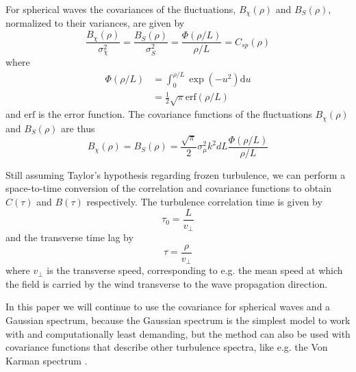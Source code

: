 For spherical waves the covariances of the fluctuations, $B_{\chi}(\rho)$ and
$B_{S}(\rho)$, normalized to their variances, are given by
\begin{equation}
 \frac{B_{\chi} (\rho)}{\sigma_{\chi}^2} = \frac{B_{S} (\rho)}{\sigma_{S}^2} = \frac{\Phi\left(\rho/L\right)}{\rho/L} = C_{sp}(\rho)
\end{equation}
where
\begin{align}\label{eq:gaussian_correlation}
 \Phi \left(\rho/L \right) &= \int_0^{\rho/L} \exp{\left(-u^2\right)} \mathrm{d} u  \\
 &= \frac{1}{2} \sqrt{\pi} \mathrm{erf}\left( \rho/L \right)
\end{align}
and $\mathrm{erf}$ is the error function.
The covariance functions of the fluctuations $B_{\chi}(\rho)$ and $B_{S}(\rho)$ are thus
\begin{equation}\label{eq:variances}
 B_{\chi} (\rho) = B_{S}(\rho) = \frac{\sqrt{\pi}}{2} \sigma_{\mu}^2 k^2 d L
\frac{\Phi(\rho/L) }{\rho / L}
\end{equation}

Still assuming Taylor's hypothesis regarding frozen turbulence, we can perform a
space-to-time conversion of the correlation and covariance functions to obtain
$C(\tau)$ and $B(\tau)$ respectively. The turbulence correlation time is given
by
\begin{equation}
 \tau_0 = \frac{L}{v_{\bot}}
\end{equation}
and the transverse time lag by
\begin{equation}
  \tau = \frac{\rho}{v_{\bot}}
\end{equation}
where $v_{\bot}$ is the transverse speed, corresponding to e.g. the mean speed
at which the field is carried by the wind transverse to the wave propagation
direction.

In this paper we will continue to use the covariance for spherical waves and a
Gaussian spectrum, because the Gaussian spectrum is the simplest model to work
with and computationally least demanding, but the method can also be used with
covariance functions that describe other turbulence spectra, like e.g. the Von
Karman spectrum \cite{Ostashev2015}.

